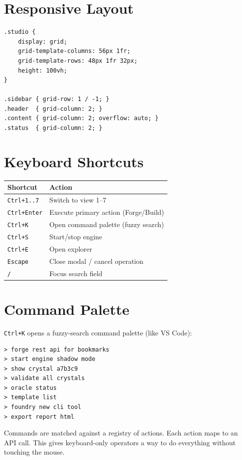 \documentclass[11pt,a4paper,twoside]{article}
\begin{document}
\section{Responsive Layout}\label{sec:responsive}

\begin{lstlisting}[title={Grid Layout}]
.studio {
    display: grid;
    grid-template-columns: 56px 1fr;
    grid-template-rows: 48px 1fr 32px;
    height: 100vh;
}

.sidebar { grid-row: 1 / -1; }
.header  { grid-column: 2; }
.content { grid-column: 2; overflow: auto; }
.status  { grid-column: 2; }
\end{lstlisting}


\section{Keyboard Shortcuts}\label{sec:keyboard}

\begin{tabularx}{\textwidth}{l X}
\toprule
\textbf{Shortcut} & \textbf{Action} \\
\midrule
\texttt{Ctrl+1..7} & Switch to view 1--7 \\
\texttt{Ctrl+Enter} & Execute primary action (Forge/Build) \\
\texttt{Ctrl+K} & Open command palette (fuzzy search) \\
\texttt{Ctrl+S} & Start/stop engine \\
\texttt{Ctrl+E} & Open explorer \\
\texttt{Escape} & Close modal / cancel operation \\
\texttt{/} & Focus search field \\
\bottomrule
\end{tabularx}


\section{Command Palette}\label{sec:cmdpalette}

\texttt{Ctrl+K} opens a fuzzy-search command palette (like VS Code):

\begin{lstlisting}
> forge rest api for bookmarks
> start engine shadow mode
> show crystal a7b3c9
> validate all crystals
> oracle status
> template list
> foundry new cli tool
> export report html
\end{lstlisting}

Commands are matched against a registry of actions. Each action maps
to an API call. This gives keyboard-only operators a way to do
everything without touching the mouse.
\end{document}
